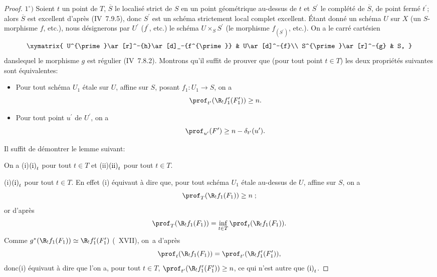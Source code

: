 \begin{proof}
$1^\circ)$ Soient $t$ un point de $T$, $\overline{S}$ le localis\'e strict de $S$ en un point g\'eom\'etrique au-dessus de $t$ et $S^{\prime}$ le compl\'et\'e de $\overline{S}$, de point ferm\'e $t^{\prime}$; alors $\overline{S}$ est excellent d'apr\`es (\EGA IV~7.9.5), donc $S^{\prime}$ est un sch\'ema strictement local complet excellent. \'Etant donn\'e un sch\'ema $U$ sur $X$ (\resp un $S$-morphisme $f$, \resp etc.), nous d\'esignerons par $U^{\prime}$ (\resp $f^{\prime}$, \resp etc.) le sch\'ema $U\times_{S}S^{\prime}$ (\resp le morphisme $f_{(S^{\prime})}$, \resp etc.). On a le carr\'e cart\'esien
$$
\xymatrix{ U^{\prime}\ar[r]^-{h}\ar[d]_-{f^{\prime}} & U\ar[d]^-{f}\\
S^{\prime}\ar[r]^-{g} & S, }
$$
dans\pageoriginale lequel le morphisme $g$ est r\'egulier (\EGA IV~7.8.2). Montrons qu'il suffit de prouver que (pour tout point $t\in T$) les deux propri\'et\'es suivantes sont \'equivalentes:
\begin{itemize}
\item[$\textup{(i)}_{t}$] Pour tout sch\'ema $U_{1}$ \'etale sur $U$, affine sur $S$, posant $f_{1}\colon U_{1}\to S$, on a
$$
\prof_{t^{\prime}}(\R_{!}f_{1}^{\prime}(F_{1}^{\prime}))\geq n.
$$

\item[$\textup{(ii)}_{t}$] Pour tout point $u^{\prime}$ de $U^{\prime}$, on a
$$
\prof_{u^{\prime}}(F^{\prime})\geq n-\delta_{t^{\prime}}(u^{\prime}).
$$
\end{itemize}
Il suffit de d\'emontrer le lemme suivant:

\begin{sublemme} \label{XIV.4.2.1}
On a \textup{(i)}\SSI$\textup{(i)}_{t}$ pour tout $t\in T$ et \textup{(ii)}\SSI$\textup{(ii)}_{t}$ pour tout $t\in T$.
\end{sublemme}

\textup{(i)}\SSI$\textup{(i)}_{t}$ pour tout $t\in T$. En effet \textup{(i)} \'equivaut \`a dire que, pour tout sch\'ema $U_{1}$ \'etale au-dessus de $U$, affine sur $S$, on a
$$
\prof_{T}(\R_{!}f_{1}(F_{1}))\geq n\;;$$
or d'apr\`es 
$$
\prof_{T}(\R_{!}f_{1}(F_{1}))=\inf_{t\in T}\prof_{t}(\R_{!}f_{1}(F_{1})).
$$
Comme $g^{\ast}(\R_{!}f_{1}(F_{1}))\simeq\R_{!}f_{1}^{\prime}(F_{1}^{\prime})$ (~XVII), on~a d'apr\`es 
$$
\prof_{t}(\R_{!}f_{1}(F_{1}))=\prof_{t^{\prime}}(\R_{!}f_{1}^{\prime}(F_{1}^{\prime})),
$$
donc\pageoriginale \textup{(i)} \'equivaut \`a dire que l'on a, pour tout $t\in T$, $\prof_{t^{\prime}}(\R_{!}f_{1}^{\prime}(F_{1}^{\prime}))\geq n$, ce qui n'est autre que $\textup{(i)}_{t}$.


\end{proof}
